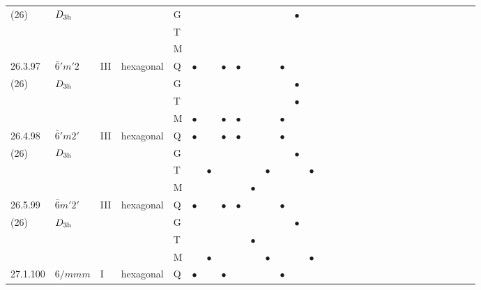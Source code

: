 \documentclass[fleqn,9pt,landscape]{jsarticle}
\begin{document}
\begin{longtable}{lllll|l|l|l|l|l|l|l|l|l|ll|ll|ll|ll|ll|ll|ll|ll}
(26) & $D_{\rm 3h}$ &  &  & G &  &  &  &  &  &  &  & $\bullet$ &  &  &  &  &  &  &  &  &  &  &  &  &  &  &  &  &  \\
 &  &  &  & T &  &  &  &  &  &  &  &  &  &  &  &  &  &  &  &  &  &  &  &  &  &  &  &  &  \\
 &  &  &  & M &  &  &  &  &  &  &  &  &  &  &  &  &  &  &  &  &  &  &  &  &  &  &  &  &  \\ \hline
26.3.97 & \texttt{$\bar{6}'m'2$} & III & hexagonal & Q & $\bullet$ &  & $\bullet$ & $\bullet$ &  &  & $\bullet$ &  &  &  &  &  &  &  &  &  &  &  &  &  &  &  &  &  &  \\
(26) & $D_{\rm 3h}$ &  &  & G &  &  &  &  &  &  &  & $\bullet$ &  &  &  &  &  &  &  &  &  &  &  &  &  &  &  &  &  \\
 &  &  &  & T &  &  &  &  &  &  &  & $\bullet$ &  &  &  &  &  &  &  &  &  &  &  &  &  &  &  &  &  \\
 &  &  &  & M & $\bullet$ &  & $\bullet$ & $\bullet$ &  &  & $\bullet$ &  &  &  &  &  &  &  &  &  &  &  &  &  &  &  &  &  &  \\ \hline
26.4.98 & \texttt{$\bar{6}'m2'$} & III & hexagonal & Q & $\bullet$ &  & $\bullet$ & $\bullet$ &  &  & $\bullet$ &  &  &  &  &  &  &  &  &  &  &  &  &  &  &  &  &  &  \\
(26) & $D_{\rm 3h}$ &  &  & G &  &  &  &  &  &  &  & $\bullet$ &  &  &  &  &  &  &  &  &  &  &  &  &  &  &  &  &  \\
 &  &  &  & T &  & $\bullet$ &  &  &  & $\bullet$ &  &  & $\bullet$ &  &  &  &  &  &  &  &  &  &  &  &  &  &  &  &  \\
 &  &  &  & M &  &  &  &  & $\bullet$ &  &  &  &  &  &  &  &  &  &  &  &  &  &  &  &  &  &  &  &  \\ \hline
26.5.99 & \texttt{$\bar{6}m'2'$} & III & hexagonal & Q & $\bullet$ &  & $\bullet$ & $\bullet$ &  &  & $\bullet$ &  &  &  &  &  &  &  &  &  &  &  &  &  &  &  &  &  &  \\
(26) & $D_{\rm 3h}$ &  &  & G &  &  &  &  &  &  &  & $\bullet$ &  &  &  &  &  &  &  &  &  &  &  &  &  &  &  &  &  \\
 &  &  &  & T &  &  &  &  & $\bullet$ &  &  &  &  &  &  &  &  &  &  &  &  &  &  &  &  &  &  &  &  \\
 &  &  &  & M &  & $\bullet$ &  &  &  & $\bullet$ &  &  & $\bullet$ &  &  &  &  &  &  &  &  &  &  &  &  &  &  &  &  \\ \hline
27.1.100 & \texttt{$6/mmm$} & I & hexagonal & Q & $\bullet$ &  & $\bullet$ &  &  &  & $\bullet$ &  &  &  &  &  &  &  &  &  &  &  &  &  &  &  &  &  &  \\

\end{longtable}
\end{document}
